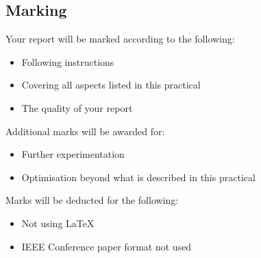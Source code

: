 \subsection{Marking}
Your report will be marked according to the following:
\begin{itemize}
    \item Following instructions
    \item Covering all aspects listed in this practical
    \item The quality of your report
\end{itemize}

Additional marks will be awarded for:
\begin{itemize}
    \item Further experimentation
    \item Optimisation beyond what is described in this practical
\end{itemize}

Marks will be deducted for the following:
\begin{itemize}
    \item Not using \LaTeX
    \item IEEE Conference paper format not used
\end{itemize}